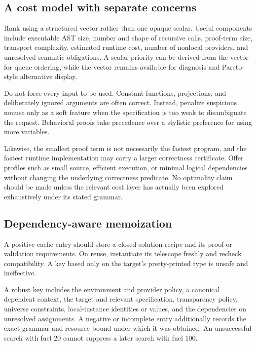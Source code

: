 \documentclass[11pt,letterpaper]{article}
\theoremstyle{definition}
\theoremstyle{remark}
\begin{document}
\subsection{A cost model with separate concerns}

Rank using a structured vector rather than one opaque scalar. Useful components include executable AST size, number and shape of recursive calls, proof-term size, transport complexity, estimated runtime cost, number of nonlocal providers, and unresolved semantic obligations. A scalar priority can be derived from the vector for queue ordering, while the vector remains available for diagnosis and Pareto-style alternative display.

Do not force every input to be used. Constant functions, projections, and deliberately ignored arguments are often correct. Instead, penalize suspicious nonuse only as a soft feature when the specification is too weak to disambiguate the request. Behavioral proofs take precedence over a stylistic preference for using more variables.

Likewise, the smallest proof term is not necessarily the fastest program, and the fastest runtime implementation may carry a larger correctness certificate. Offer profiles such as small source, efficient execution, or minimal logical dependencies without changing the underlying correctness predicate. No optimality claim should be made unless the relevant cost layer has actually been explored exhaustively under its stated grammar.

\subsection{Dependency-aware memoization}

A positive cache entry should store a closed solution recipe and its proof or validation requirements. On reuse, instantiate its telescope freshly and recheck compatibility. A key based only on the target's pretty-printed type is unsafe and ineffective.

A robust key includes the environment and provider policy, a canonical dependent context, the target and relevant specification, transparency policy, universe constraints, local-instance identities or values, and the dependencies on unresolved assignments. A negative or incomplete entry additionally records the exact grammar and resource bound under which it was obtained. An unsuccessful search with fuel 20 cannot suppress a later search with fuel 100.
\end{document}
